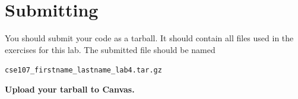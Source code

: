 \documentclass[11pt]{cselabheader}
\begin{document}
\pagebreak
\section{Submitting}

You should submit your code as a tarball. It should contain all files
used in the exercises for this lab. The submitted file should be named
\begin{center}
  \texttt{cse107\_firstname\_lastname\_lab4.tar.gz}
\end{center}

\begin{center}
  \textbf{Upload your tarball to Canvas.}
\end{center}

\listoftheorems
\end{document}
